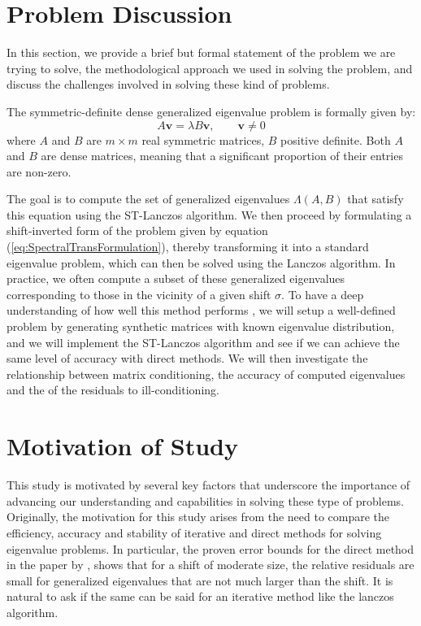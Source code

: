 \section{Problem Discussion}\label{sec:ProblemDiscussion}

In this section, we provide a brief but formal statement of the problem we are trying to solve, the methodological approach we used in solving the problem, and discuss the challenges involved in solving these kind of problems.

The symmetric-definite dense generalized eigenvalue problem is formally given by:
\begin{equation}\label{eq:GenEigVal_Problem}
	A\mathbf{v} = \lambda B\mathbf{v}, \qquad \mathbf{v} \neq 0
\end{equation}
where $A$ and $B$ are $m \times m$ real symmetric matrices, $B$ positive definite. Both $A$ and $B$ are dense matrices, meaning that a significant proportion of their entries are non-zero.

The goal is to compute the set of generalized eigenvalues $\Lambda(A, B)$ that satisfy this equation using the ST-Lanczos algorithm. We then proceed by formulating a shift-inverted form of the problem given by equation (\ref{eq:SpectralTransFormulation}), thereby transforming it into a standard eigenvalue problem, which can then be solved using the Lanczos algorithm. In practice, we often compute a subset of these generalized eigenvalues corresponding to those in the vicinity of a given shift $\sigma$. To have a deep understanding of how well this method performs , we will setup a well-defined problem by generating synthetic matrices with known eigenvalue distribution, and we will implement the ST-Lanczos algorithm and see if we can achieve the same level of accuracy with direct methods. We will then investigate the relationship between matrix conditioning, the accuracy of computed eigenvalues and the  of the residuals to ill-conditioning.

\section{Motivation of Study}\label{sec:MoitavationOfStudy}

This study is motivated by several key factors that underscore the importance of advancing our understanding and capabilities in solving these type of problems. Originally, the motivation for this study arises from the need to compare the efficiency, accuracy and stability of iterative and direct methods for solving eigenvalue problems. In particular, the proven error bounds for the direct method in the paper by \cite{stewart2024spectraltransformationdensesymmetric}, shows that for a shift of moderate size, the relative residuals are small for generalized eigenvalues that are not much larger than the shift. It is natural to ask if the same can be said for an iterative method like the lanczos algorithm.


